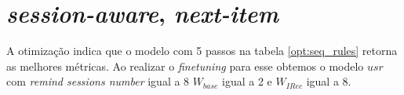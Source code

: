 

\section{\textit{session-aware}, \textit{next-item}}

A otimização indica que o modelo com 5 passos na tabela \ref{opt:seq_rules}
retorna as melhores métricas. Ao realizar o \textit{finetuning} para esse
obtemos o modelo $usr$ com \textit{remind sessions number} igual a 8 $W_{base}$
igual a 2 e $W_{IRec}$ igual a 8.

